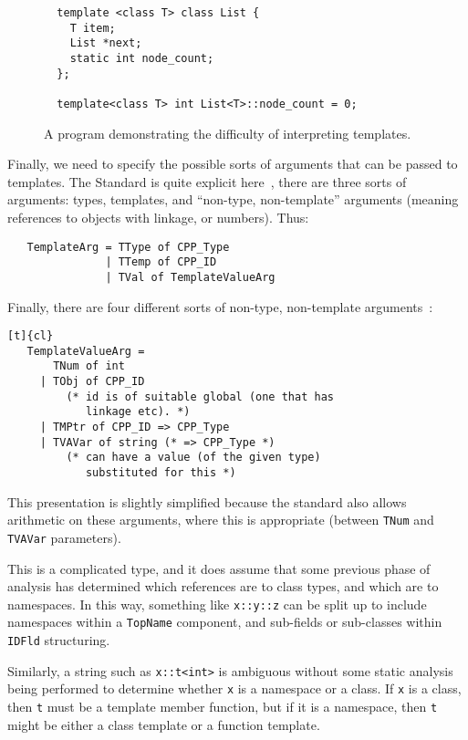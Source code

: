 \documentclass[11pt]{article}
\begin{document}
\begin{figure}
\begin{verbatim}
  template <class T> class List {
    T item;
    List *next;
    static int node_count;
  };

  template<class T> int List<T>::node_count = 0;
\end{verbatim}
\caption{A program demonstrating the difficulty of interpreting
  templates.}
\label{fig:templates-not-interpretable}
\end{figure}



Finally, we need to specify the possible sorts of arguments that can
be passed to templates.  The Standard is quite explicit
here~\cite[\S14.3~para~1]{cpp-standard-iso14882}, there are three
sorts of arguments: types, templates, and ``non-type, non-template''
arguments (meaning references to objects with linkage, or numbers).
Thus:
\begin{verbatim}
   TemplateArg = TType of CPP_Type
               | TTemp of CPP_ID
               | TVal of TemplateValueArg
\end{verbatim}
Finally, there are four different sorts of non-type, non-template
arguments~\cite[\S14.3.2~para~1]{cpp-standard-iso14882}:
\begin{verbatim}[t]{cl}
   TemplateValueArg =
       TNum of int
     | TObj of CPP_ID
         (* id is of suitable global (one that has
            linkage etc). *)
     | TMPtr of CPP_ID => CPP_Type
     | TVAVar of string (* => CPP_Type *)
         (* can have a value (of the given type)
            substituted for this *)
\end{verbatim}
This presentation is slightly simplified because the standard also
allows arithmetic on these arguments, where this is appropriate
(between \texttt{TNum} and \texttt{TVAVar} parameters).

This is a complicated type, and it does assume that some previous
phase of analysis has determined which references are to class types,
and which are to namespaces.  In this way, something like
\texttt{x::y::z} can be split up to include namespaces within a
\texttt{TopName} component, and sub-fields or sub-classes within
\texttt{IDFld} structuring.

Similarly, a string such as \texttt{x::t<int>} is ambiguous without
some static analysis being performed to determine whether \texttt{x}
is a namespace or a class.  If \texttt{x} is a class, then \texttt{t}
must be a template member function, but if it is a namespace, then
\texttt{t} might be either a class template or a function template.
\end{document}
